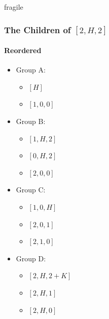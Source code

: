 \documentclass[aspectratio=169,usenames,dvipsnames]{beamer}
\begin{document}
\begin{frame}{fragile}
    \frametitle{The Children of $[2, H, 2]$}
    \framesubtitle{Reordered}
    
    \begin{multicols}{2}
    \begin{itemize}
        \item Group A:
        \begin{itemize}
            \item $[H]$
            \item $[1, 0, 0]$
        \end{itemize}
    \end{itemize}
    \text{$  $} %
    
    \begin{itemize}
        \item Group B:
        \begin{itemize}
            \item $[1, H, 2]$
            \item $[0, H, 2]$
            \item $[2, 0, 0]$
        \end{itemize}
    \end{itemize}
    
    \begin{itemize}
        \item Group C:
        \begin{itemize}
            \item $[1, 0, H]$
            \item $[2, 0, 1]$
            \item $[2, 1, 0]$
        \end{itemize}
    \end{itemize}
    
    \begin{itemize}
        \item Group D:
        \begin{itemize}
            \item $[2, H, 2 + K]$
            \item $[2, H, 1]$
            \item $[2, H, 0]$
        \end{itemize}
    \end{itemize}
    \end{multicols}
    
\end{frame}
\end{document}
